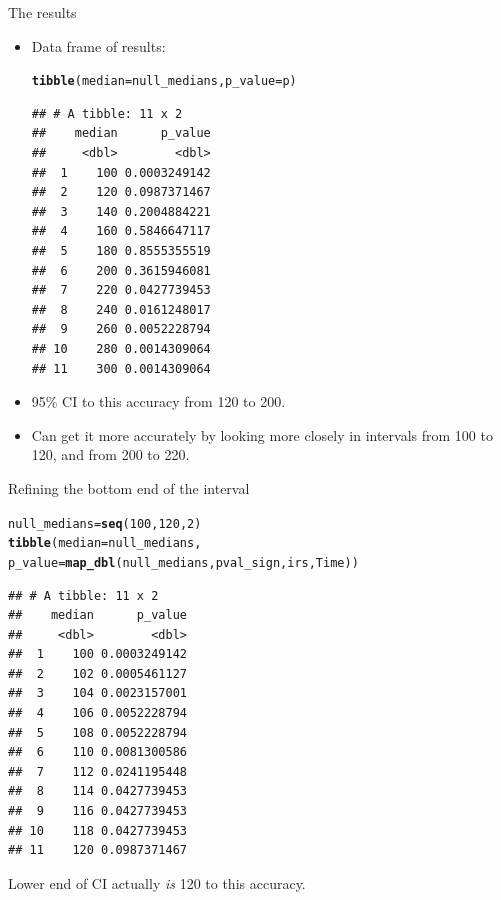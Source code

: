 \documentclass[unknownkeysallowed]{beamer}\usepackage[]{graphicx}\usepackage[]{color}
\makeatletter
\newcommand{\hlnum}[1]{\textcolor[rgb]{0.686,0.059,0.569}{#1}}%
\newcommand{\hlstd}[1]{\textcolor[rgb]{0.345,0.345,0.345}{#1}}%
\newcommand{\hlkwb}[1]{\textcolor[rgb]{0.69,0.353,0.396}{#1}}%
\newcommand{\hlkwc}[1]{\textcolor[rgb]{0.333,0.667,0.333}{#1}}%
\newcommand{\hlkwd}[1]{\textcolor[rgb]{0.737,0.353,0.396}{\textbf{#1}}}%
\newenvironment{kframe}{%
 \def\at@end@of@kframe{}%
 \ifinner\ifhmode%
  \def\at@end@of@kframe{\end{minipage}}%
  \begin{minipage}{\columnwidth}%
 \fi\fi%
 \def\FrameCommand##1{\hskip\@totalleftmargin \hskip-\fboxsep
 \colorbox{shadecolor}{##1}\hskip-\fboxsep
     \hskip-\linewidth \hskip-\@totalleftmargin \hskip\columnwidth}%
 \MakeFramed {\advance\hsize-\width
   \@totalleftmargin\z@ \linewidth\hsize
   \@setminipage}}%
 {\par\unskip\endMakeFramed%
 \at@end@of@kframe}
\newenvironment{knitrout}{}{} %
\makeatother
\begin{document}
\begin{frame}[fragile]{The results}
\begin{itemize}
\item Data frame of results:
\begin{knitrout}\footnotesize
{}\color{fgcolor}\begin{kframe}
\begin{alltt}
\hlkwd{tibble}\hlstd{(}\hlkwc{median}\hlstd{=null_medians,}\hlkwc{p_value}\hlstd{=p)}
\end{alltt}
\begin{verbatim}
## # A tibble: 11 x 2
##    median      p_value
##     <dbl>        <dbl>
##  1    100 0.0003249142
##  2    120 0.0987371467
##  3    140 0.2004884221
##  4    160 0.5846647117
##  5    180 0.8555355519
##  6    200 0.3615946081
##  7    220 0.0427739453
##  8    240 0.0161248017
##  9    260 0.0052228794
## 10    280 0.0014309064
## 11    300 0.0014309064
\end{verbatim}
\end{kframe}
\end{knitrout}
\item 95\% CI to this accuracy from 120 to 200.
\item Can get it more accurately by looking more closely in intervals
  from 100 to 120, and from 200 to 220.
\end{itemize}
\end{frame}

\begin{frame}[fragile]{Refining the bottom end of the interval}
  
  \begin{small}
\begin{knitrout}
\color{fgcolor}\begin{kframe}
\begin{alltt}
\hlstd{null_medians}\hlkwb{=}\hlkwd{seq}\hlstd{(}\hlnum{100}\hlstd{,}\hlnum{120}\hlstd{,}\hlnum{2}\hlstd{)}
\hlkwd{tibble}\hlstd{(}\hlkwc{median}\hlstd{=null_medians,}
       \hlkwc{p_value}\hlstd{=}\hlkwd{map_dbl}\hlstd{(null_medians,pval_sign,irs,Time))}
\end{alltt}
\begin{verbatim}
## # A tibble: 11 x 2
##    median      p_value
##     <dbl>        <dbl>
##  1    100 0.0003249142
##  2    102 0.0005461127
##  3    104 0.0023157001
##  4    106 0.0052228794
##  5    108 0.0052228794
##  6    110 0.0081300586
##  7    112 0.0241195448
##  8    114 0.0427739453
##  9    116 0.0427739453
## 10    118 0.0427739453
## 11    120 0.0987371467
\end{verbatim}
\end{kframe}
\end{knitrout}
  \end{small}

Lower end of CI actually \emph{is} 120 to this accuracy.
  
\end{frame}
\end{document}
